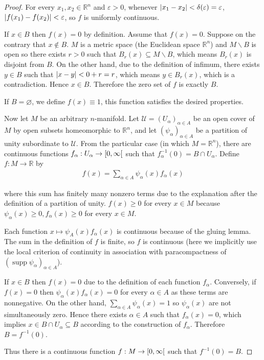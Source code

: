 \begin{proof}
	For every $x_{1}, x_{2} \in \mathbb{R}^{n}$ and $\varepsilon > 0$, whenever $\left\vert{x_{1} - x_{2}}\right\vert < \delta(\varepsilon) = \varepsilon$, $\left\vert{f(x_{1}) - f(x_{2})}\right\vert < \varepsilon$, so $f$ is uniformly continuous.

	If $x\in B$ then $f(x) = 0$ by definition. Assume that $f(x) = 0$. Suppose on the contrary that $x\notin B$. $M$ is a metric space (the Euclidean space $\mathbb{R}^{n}$) and $M\smallsetminus B$ is open so there exists $r > 0$ such that $B_{r}(x) \subseteq M\smallsetminus B$, which means $B_{r}(x)$ is disjoint from $B$. On the other hand, due to the definition of infimum, there exists $y\in B$ such that $\left\vert{x - y}\right\vert < 0 + r = r$, which means $y \in B_{r}(x)$, which is a contradiction. Hence $x\in B$. Therefore the zero set of $f$ is exactly $B$.

	If $B = \varnothing$, we define $f(x) \equiv 1$, this function satisfies the desired properties.

	Now let $M$ be an arbitrary $n$-manifold. Let $\mathscr{U} = {(U_{\alpha})}_{\alpha\in A}$ be an open cover of $M$ by open subsets homeomorphic to $\mathbb{R}^{n}$, and let ${(\psi_{\alpha})}_{\alpha\in A}$ be a partition of unity subordinate to $\mathscr{U}$. From the particular case (in which $M = \mathbb{R}^{n}$), there are continuous functions $f_{\alpha}: U_{\alpha} \to \left[{0, \infty}\right[$ such that $f_{\alpha}^{-1}(0) = B \cap U_{\alpha}$. Define $f: M\to \mathbb{R}$ by
	\begin{align*}
		f(x) = \sum_{\alpha\in A} \psi_{\alpha}(x)f_{\alpha}(x)
	\end{align*}

	where this sum has finitely many nonzero terms due to the explanation after the definition of a partition of unity. $f(x) \geq 0$ for every $x\in M$ because $\psi_{\alpha}(x) \geq 0, f_{\alpha}(x) \geq 0$ for every $x\in M$.

	Each function $x\mapsto \psi_{A}(x)f_{\alpha}(x)$ is continuous because of the gluing lemma. The sum in the definition of $f$ is finite, so $f$ is continuous (here we implicitly use the local criterion of continuity in association with paracompactness of ${(\operatorname{supp}\psi_{\alpha})}_{\alpha\in A}$).

	If $x\in B$ then $f(x) = 0$ due to the definition of each function $f_{\alpha}$. Conversely, if $f(x) = 0$ then $\psi_{\alpha}(x)f_{\alpha}(x) = 0$ for every $\alpha\in A$ as these terms are nonnegative. On the other hand, $\sum_{\alpha\in A}\psi_{\alpha}(x) = 1$ so $\psi_{\alpha}(x)$ are not simultaneously zero. Hence there exists $\alpha\in A$ such that $f_{\alpha}(x) = 0$, which implies $x \in B\cap U_{\alpha} \subseteq B$ according to the construction of $f_{\alpha}$. Therefore $B = f^{-1}(0)$.

	Thus there is a continuous function $f: M \to \left[{0, \infty}\right[$ such that $f^{-1}(0) = B$.
\end{proof}

